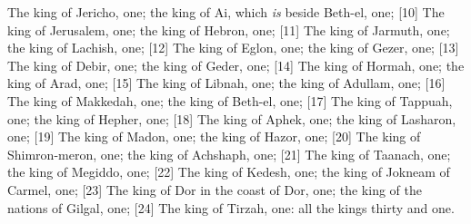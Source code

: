 \textcolor[cmyk]{0.99998,1,0,0}{The king of Jericho, one; the king of Ai, which \emph{is} beside Beth-el, one;}
[10] \textcolor[cmyk]{0.99998,1,0,0}{The king of Jerusalem, one; the king of Hebron, one;}
[11] \textcolor[cmyk]{0.99998,1,0,0}{The king of Jarmuth, one; the king of Lachish, one;}
[12] \textcolor[cmyk]{0.99998,1,0,0}{The king of Eglon, one; the king of Gezer, one;}
[13] \textcolor[cmyk]{0.99998,1,0,0}{The king of Debir, one; the king of Geder, one;}
[14] \textcolor[cmyk]{0.99998,1,0,0}{The king of Hormah, one; the king of Arad, one;}
[15] \textcolor[cmyk]{0.99998,1,0,0}{The king of Libnah, one; the king of Adullam, one;}
[16] \textcolor[cmyk]{0.99998,1,0,0}{The king of Makkedah, one; the king of Beth-el, one;}
[17] \textcolor[cmyk]{0.99998,1,0,0}{The king of Tappuah, one; the king of Hepher, one;}
[18] \textcolor[cmyk]{0.99998,1,0,0}{The king of Aphek, one; the king of Lasharon, one;}
[19] \textcolor[cmyk]{0.99998,1,0,0}{The king of Madon, one; the king of Hazor, one;}
[20] \textcolor[cmyk]{0.99998,1,0,0}{The king of Shimron-meron, one; the king of Achshaph, one;}
[21] \textcolor[cmyk]{0.99998,1,0,0}{The king of Taanach, one; the king of Megiddo, one;}
[22] \textcolor[cmyk]{0.99998,1,0,0}{The king of Kedesh, one; the king of Jokneam of Carmel, one;}
[23] \textcolor[cmyk]{0.99998,1,0,0}{The king of Dor in the coast of Dor, one; the king of the nations of Gilgal, one;}
[24] \textcolor[cmyk]{0.99998,1,0,0}{The king of Tirzah, one: all the kings thirty and one.}